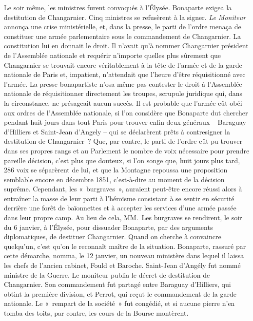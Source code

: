 \documentclass[french,twoside]{book} %
\begin{document}
Le soir même, les ministres furent convoqués à l’Élysée. Bonaparte exigea la destitution de Changarnier. Cinq ministres se refusèrent à la signer. \emph{Le Moniteur} annonça une crise ministérielle, et, dans la presse, le parti de l’ordre menaça de constituer une armée parlementaire sous le commandement de Changarnier. La constitution lui en donnait le droit. Il n’avait qu’à nommer Changarnier président de l’Assemblée nationale et requérir n’importe quelles plus sûrement que Changarnier se trouvait encore véritablement à la tête de l’armée et de la garde nationale de Paris et, impatient, n’attendait que l’heure d’être réquisitionné avec l’armée. La presse bonapartiste n’osa même pas contester le droit à l’Assemblée nationale de réquisitionner directement les troupes, scrupule juridique qui, dans la circonstance, ne présageait aucun succès. Il est probable que l’armée eût obéi aux ordres de l’Assemblée nationale, si l’on considère que Bonaparte dut chercher pendant huit jours dans tout Paris pour trouver enfin deux généraux – Baraguay d’Hilliers et Saint-Jean d’Angely – qui se déclarèrent prêts à contresigner la destitution de Changarnier ? Que, par contre, le parti de l’ordre eût pu trouver dans ses propres rangs et au Parlement le nombre de voix nécessaire pour prendre pareille décision, c’est plus que douteux, si l’on songe que, huit jours plus tard, 286 voix se séparèrent de lui, et que la Montagne repoussa une proposition semblable encore en décembre 1851, c’est-à-dire au moment de la décision suprême. Cependant, les « burgraves », auraient peut-être encore réussi alors à entraîner la masse de leur parti à l’héroïsme consistant à se sentir en sécurité derrière une forêt de baïonnettes et à accepter les services d’une armée passée dans leur propre camp. Au lieu de cela, MM. Les burgraves se rendirent, le soir du 6 janvier, à l’Élysée, pour dissuader Bonaparte, par des arguments diplomatiques, de destituer Changarnier. Quand on cherche à convaincre quelqu’un, c’est qu’on le reconnaît maître de la situation. Bonaparte, rassuré par cette démarche, nomma, le 12 janvier, un nouveau ministère dans lequel il laissa les chefs de l’ancien cabinet, Fould et Baroche. Saint-Jean d’Angély fut nommé ministre de la Guerre. Le moniteur publia le décret de destitution de Changarnier. Son commandement fut partagé entre Baraguay d’Hilliers, qui obtint la première division, et Perrot, qui reçut le commandement de la garde nationale. Le « rempart de la société » fut congédié, et si aucune pierre n’en tomba des toits, par contre, les cours de la Bourse montèrent.\par
\end{document}
